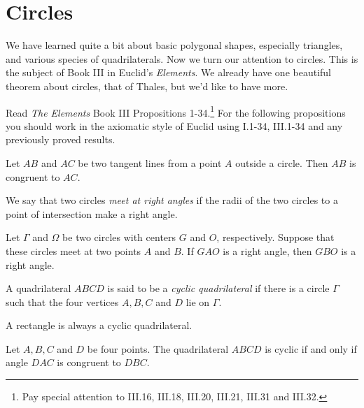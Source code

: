 \chapter{Circles}

We have learned quite a bit about basic polygonal shapes, especially triangles, and various species of quadrilaterals. Now we turn our attention to circles. This is the subject of Book III in Euclid's \emph{Elements}. We already have one beautiful theorem about circles, that of Thales, but we'd like to have more.


Read \emph{The Elements} Book III Propositions 1-34.\footnote{Pay special attention to III.16, III.18, III.20, III.21, III.31 and III.32.}
For the following propositions you should work in the axiomatic style of Euclid using I.1-34,  III.1-34 and any previously proved results.



\begin{conjecture}\label{conj:tangents-to-circle}
Let $AB$ and $AC$ be two tangent lines from a point $A$ outside a circle. Then $AB$ is congruent to $AC$.
\end{conjecture}

\begin{definition}\label{defn:circles-perp}
We say that two circles \emph{meet at right angles} if the radii of the two circles to a point of intersection make a right angle.
\end{definition}

\begin{conjecture}\label{conj:perp-circles}
Let $\Gamma$ and $\Omega$ be two circles with centers $G$ and $O$, respectively. Suppose that these circles meet at two points $A$ and $B$. If $GAO$ is a right angle, then $GBO$ is a right angle.
\end{conjecture}


\begin{definition}\label{defn:cyclic-quad}
A quadrilateral $ABCD$ is said to be a \emph{cyclic quadrilateral} if there is a circle $\Gamma$ such that the four vertices $A,B,C$ and $D$ lie on $\Gamma$.
\end{definition}

\begin{conjecture}\label{conj:rect-cyclic}
A rectangle is always a cyclic quadrilateral.
\end{conjecture}

\begin{conjecture}\label{conj:angles-cyclic-quad}
Let $A,B,C$ and $D$ be four points. The quadrilateral $ABCD$ is cyclic if and only if angle $DAC$ is congruent to $DBC$.
\end{conjecture}


